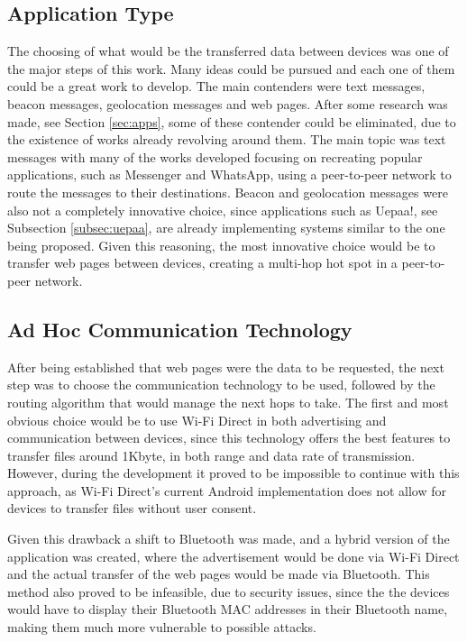 \subsection{Application Type}

The choosing of what would be the transferred data between devices was one of the major steps of this work. Many ideas could be pursued and each one of them could be a great work to develop. The main contenders were text messages, beacon messages, geolocation messages and web pages. After some research was made, see Section \ref{sec:apps}, some of these contender could be eliminated, due to the existence of works already revolving around them. The main topic was text messages with many of the works developed focusing on recreating popular applications, such as Messenger and WhatsApp, using a peer-to-peer network to route the messages to their destinations. Beacon and geolocation messages were also not a completely innovative choice, since applications such as Uepaa!, see Subsection \ref{subsec:uepaa}, are already implementing systems similar to the one being proposed. Given this reasoning, the most innovative choice would be to transfer web pages between devices, creating a multi-hop hot spot in a peer-to-peer network.

\subsection{Ad Hoc Communication Technology}

After being established that web pages were the data to be requested, the next step was to choose the communication technology to be used, followed by the routing algorithm that would manage the next hops to take. The first and most obvious choice would be to use Wi-Fi Direct in both advertising and communication between devices, since this technology offers the best features to transfer files around 1Kbyte, in both range and data rate of transmission. However, during the development it proved to be impossible to continue with this approach, as Wi-Fi Direct's current Android implementation does not allow for devices to transfer files without user consent.

Given this drawback a shift to Bluetooth was made, and a hybrid version of the application was created, where the advertisement would be done via Wi-Fi Direct and the actual transfer of the web pages would be made via Bluetooth. This method also proved to be infeasible, due to security issues, since the the devices would have to display their Bluetooth MAC addresses in their Bluetooth name, making them much more vulnerable to possible attacks.

